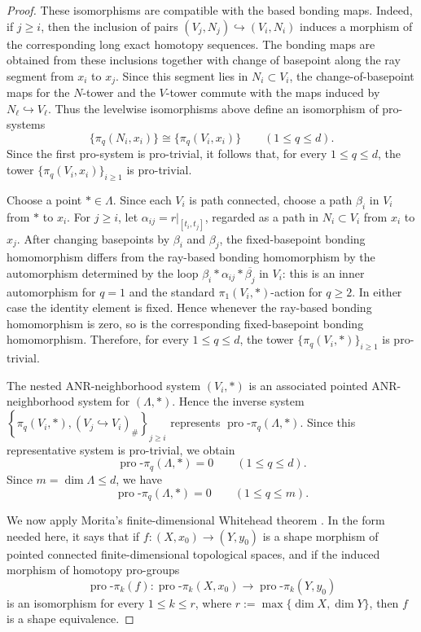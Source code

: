 \documentclass[12pt,oneside,a4paper]{article}
\theoremstyle{mytheorem}
\theoremstyle{remark}
\theoremstyle{definition}
\begin{document}
\begin{proof}
These isomorphisms are compatible with the based bonding maps. Indeed, if
\(j\ge i\), then the inclusion of pairs $(V_j,N_j)\hookrightarrow (V_i,N_i)$
induces a morphism of the corresponding long exact homotopy sequences. The
bonding maps are obtained from these inclusions together with change of
basepoint along the ray segment from \(x_i\) to \(x_j\). Since this segment lies
in \(N_i\subset V_i\), the change-of-basepoint maps for the \(N\)-tower and the
\(V\)-tower commute with the maps induced by \(N_\ell\hookrightarrow V_\ell\).
Thus the levelwise isomorphisms above define an isomorphism of pro-systems
\[
\{\pi_q(N_i,x_i)\}\cong \{\pi_q(V_i,x_i)\}
\qquad
(1\le q\le d).
\]
Since the first pro-system is pro-trivial, it follows that, for every
\(1\le q\le d\), the tower \(\{\pi_q(V_i,x_i)\}_{i\ge1}\) is pro-trivial.

Choose a point \(*\in\Lambda\). Since each \(V_i\) is path connected, choose
a path \(\beta_i\) in \(V_i\) from \(*\) to \(x_i\). For \(j\geq i\), let
\(\alpha_{ij}=r|_{[t_i,t_j]}\), regarded as a path in \(N_i\subset V_i\)
from \(x_i\) to \(x_j\). After changing basepoints by \(\beta_i\) and
\(\beta_j\), the fixed-basepoint bonding homomorphism differs from the
ray-based bonding homomorphism by the automorphism determined by the loop
\(\beta_i*\alpha_{ij}*\overline{\beta_j}\) in \(V_i\): this is an inner
automorphism for \(q=1\) and the standard \(\pi_1(V_i,*)\)-action for
\(q\geq2\). In either case the identity element is fixed. Hence whenever the
ray-based bonding homomorphism is zero, so is the corresponding
fixed-basepoint bonding homomorphism. Therefore, for every \(1\le q\le d\),
the tower
\(\{\pi_q(V_i,*)\}_{i\ge1}\) is pro-trivial.

The nested ANR-neighborhood system \((V_i,*)\) is an associated pointed
ANR-neighborhood system for \((\Lambda,*)\). Hence the inverse system
$\left\{\pi_q(V_i,*),(V_j\hookrightarrow V_i)_\#\right\}_{j\ge i}$
represents
$\operatorname{pro}\text{-}\pi_q(\Lambda,*).$
Since this representative system is pro-trivial, we obtain
\[
\operatorname{pro}\text{-}\pi_q(\Lambda,*)=0
\qquad
(1\le q\le d).
\]
Since
\(m=\dim\Lambda\le d\), we have
\[
\operatorname{pro}\text{-}\pi_q(\Lambda,*)=0
\qquad
(1\le q\le m).
\]

We now apply Morita's finite-dimensional Whitehead theorem
\cite[Theorem~1.2, p.~394]{zbMATH03497097}. In the form needed here, it says that if
\(f\colon(X,x_0)\to(Y,y_0)\) is a shape morphism of pointed connected finite-dimensional topological spaces, and if the induced morphism of homotopy pro-groups
\[
\operatorname{pro}\text{-}\pi_k(f)\colon
\operatorname{pro}\text{-}\pi_k(X,x_0)
\longrightarrow
\operatorname{pro}\text{-}\pi_k(Y,y_0)
\]
is an isomorphism for every \(1\leq k\leq r\), where
\(r:=\max\{\dim X,\dim Y\}\),
then \(f\) is a shape equivalence.


\end{proof}
\end{document}
